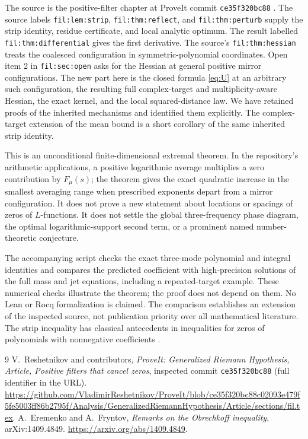 \documentclass[11pt]{article}
\theoremstyle{remark}\newtheorem{remark}[theorem]{Remark}
\begin{document}
The source is the positive-filter chapter at ProveIt commit \texttt{ce35f320bc88} \cite{ProveIt}. The source labels \texttt{fil:lem:strip}, \texttt{fil:thm:reflect}, and \texttt{fil:thm:perturb} supply the strip identity, residue certificate, and local analytic optimum. The result labelled \texttt{fil:thm:differential} gives the first derivative. The source's \texttt{fil:thm:hessian} treats the coalesced configuration in symmetric-polynomial coordinates. Open item 2 in \texttt{fil:sec:open} asks for the Hessian at general positive mirror configurations. The new part here is the closed formula \eqref{eq:U} at an arbitrary such configuration, the resulting full complex-target and multiplicity-aware Hessian, the exact kernel, and the local squared-distance law. We have retained proofs of the inherited mechanisms and identified them explicitly. The complex-target extension of the mean bound is a short corollary of the same inherited strip identity.

This is an unconditional finite-dimensional extremal theorem. In the repository's arithmetic applications, a positive logarithmic average multiplies a zero contribution by $F_\mu(s)$; the theorem gives the exact quadratic increase in the smallest averaging range when prescribed exponents depart from a mirror configuration. It does not prove a new statement about locations or spacings of zeros of $L$-functions. It does not settle the global three-frequency phase diagram, the optimal logarithmic-support second term, or a prominent named number-theoretic conjecture.

The accompanying script checks the exact three-mode polynomial and integral identities and compares the predicted coefficient with high-precision solutions of the full mass and jet equations, including a repeated-target example. These numerical checks illustrate the theorem; the proof does not depend on them. No Lean or Rocq formalization is claimed. The comparison establishes an extension of the inspected source, not publication priority over all mathematical literature. The strip inequality has classical antecedents in inequalities for zeros of polynomials with nonnegative coefficients \cite{EF}.

\begin{thebibliography}{9}
V.~Reshetnikov and contributors, \emph{ProveIt: Generalized Riemann Hypothesis, Article, Positive filters that cancel zeros}, inspected commit \texttt{ce35f320bc88} (full identifier in the URL).
\url{https://github.com/VladimirReshetnikov/ProveIt/blob/ce35f320bc88c02093e479f5fe5003ff86b2795f/Analysis/GeneralizedRiemannHypothesis/Article/sections/fil.tex}.
A.~Eremenko and A.~Fryntov, \emph{Remarks on the Obrechkoff inequality}, arXiv:1409.4849.
\url{https://arxiv.org/abs/1409.4849}.
\end{thebibliography}
\end{document}
